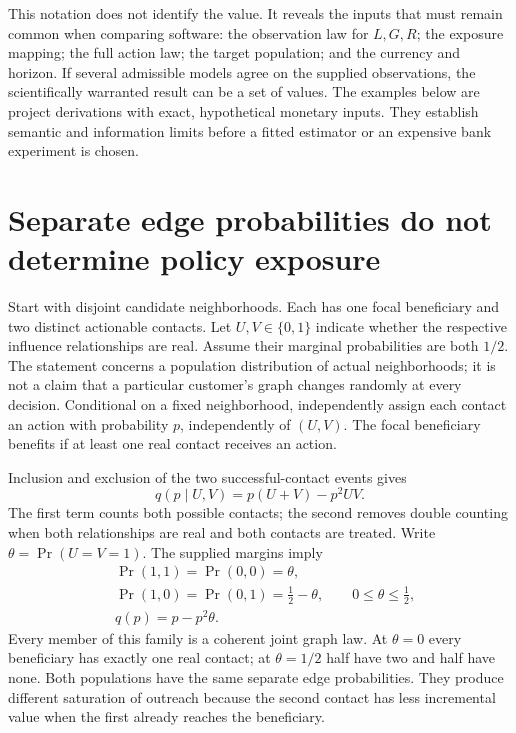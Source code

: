 This notation does not identify the value. It reveals the inputs that must
remain common when comparing software: the observation law for $L,G,R$;
the exposure mapping; the full action law; the target population; and the
currency and horizon. If several admissible models agree on the supplied
observations, the scientifically warranted result can be a set of values.
The examples below are project derivations with exact, hypothetical monetary
inputs. They establish semantic and information limits before a fitted
estimator or an expensive bank experiment is chosen.~\citep{exec17_s7_math}

\section{Separate edge probabilities do not determine policy exposure}
\label{exec17:s7-overlap}

Start with disjoint candidate neighborhoods. Each has one focal beneficiary and
two distinct actionable contacts. Let $U,V\in\{0,1\}$ indicate whether the
respective influence relationships are real. Assume their marginal probabilities
are both $1/2$. The statement concerns a population distribution of actual
neighborhoods; it is not a claim that a particular customer's graph changes
randomly at every decision. Conditional on a fixed neighborhood, independently
assign each contact an action with probability $p$, independently of $(U,V)$.
The focal beneficiary benefits if at least one real contact receives an action.

Inclusion and exclusion of the two successful-contact events gives
\begin{equation}
 q(p\mid U,V)=p(U+V)-p^2UV.
 \label{exec17:s7-exposure}
\end{equation}
The first term counts both possible contacts; the second removes double counting
when both relationships are real and both contacts are treated. Write
$\theta=\Pr(U=V=1)$. The supplied margins imply
\begin{equation}
 \begin{split}
  &\Pr(1,1)=\Pr(0,0)=\theta,\\
  &\Pr(1,0)=\Pr(0,1)=\tfrac12-\theta,
  \qquad 0\leq\theta\leq\tfrac12,\\
  &q(p)=p-p^2\theta.
 \end{split}
 \label{exec17:s7-sharp-family}
\end{equation}
Every member of this family is a coherent joint graph law. At $\theta=0$ every
beneficiary has exactly one real contact; at $\theta=1/2$ half have two and half
have none. Both populations have the same separate edge probabilities. They
produce different saturation of outreach because the second contact has less
incremental value when the first already reaches the beneficiary.

